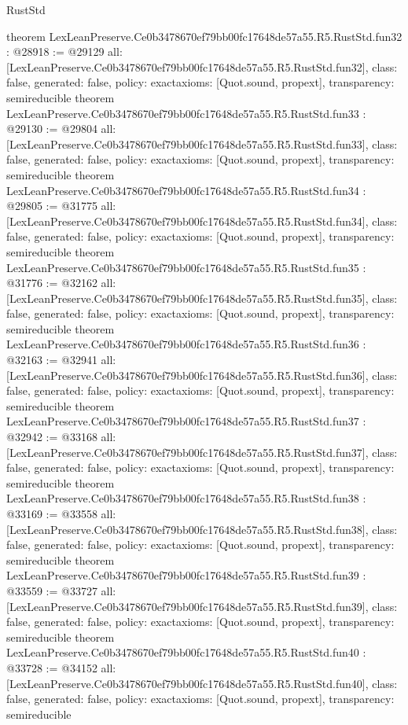 \begin{lexlean}{RustStd}
\begin{coremodule}
{}
theorem LexLeanPreserve.Ce0b3478670ef79bb00fc17648de57a55.R5.RustStd.fun32 : @28918 := @29129 {
  all: [LexLeanPreserve.Ce0b3478670ef79bb00fc17648de57a55.R5.RustStd.fun32],
  class: false,
  generated: false,
  policy: exact{axioms: [Quot.sound, propext]},
  transparency: semireducible
}
theorem LexLeanPreserve.Ce0b3478670ef79bb00fc17648de57a55.R5.RustStd.fun33 : @29130 := @29804 {
  all: [LexLeanPreserve.Ce0b3478670ef79bb00fc17648de57a55.R5.RustStd.fun33],
  class: false,
  generated: false,
  policy: exact{axioms: [Quot.sound, propext]},
  transparency: semireducible
}
theorem LexLeanPreserve.Ce0b3478670ef79bb00fc17648de57a55.R5.RustStd.fun34 : @29805 := @31775 {
  all: [LexLeanPreserve.Ce0b3478670ef79bb00fc17648de57a55.R5.RustStd.fun34],
  class: false,
  generated: false,
  policy: exact{axioms: [Quot.sound, propext]},
  transparency: semireducible
}
theorem LexLeanPreserve.Ce0b3478670ef79bb00fc17648de57a55.R5.RustStd.fun35 : @31776 := @32162 {
  all: [LexLeanPreserve.Ce0b3478670ef79bb00fc17648de57a55.R5.RustStd.fun35],
  class: false,
  generated: false,
  policy: exact{axioms: [Quot.sound, propext]},
  transparency: semireducible
}
theorem LexLeanPreserve.Ce0b3478670ef79bb00fc17648de57a55.R5.RustStd.fun36 : @32163 := @32941 {
  all: [LexLeanPreserve.Ce0b3478670ef79bb00fc17648de57a55.R5.RustStd.fun36],
  class: false,
  generated: false,
  policy: exact{axioms: [Quot.sound, propext]},
  transparency: semireducible
}
theorem LexLeanPreserve.Ce0b3478670ef79bb00fc17648de57a55.R5.RustStd.fun37 : @32942 := @33168 {
  all: [LexLeanPreserve.Ce0b3478670ef79bb00fc17648de57a55.R5.RustStd.fun37],
  class: false,
  generated: false,
  policy: exact{axioms: [Quot.sound, propext]},
  transparency: semireducible
}
theorem LexLeanPreserve.Ce0b3478670ef79bb00fc17648de57a55.R5.RustStd.fun38 : @33169 := @33558 {
  all: [LexLeanPreserve.Ce0b3478670ef79bb00fc17648de57a55.R5.RustStd.fun38],
  class: false,
  generated: false,
  policy: exact{axioms: [Quot.sound, propext]},
  transparency: semireducible
}
theorem LexLeanPreserve.Ce0b3478670ef79bb00fc17648de57a55.R5.RustStd.fun39 : @33559 := @33727 {
  all: [LexLeanPreserve.Ce0b3478670ef79bb00fc17648de57a55.R5.RustStd.fun39],
  class: false,
  generated: false,
  policy: exact{axioms: [Quot.sound, propext]},
  transparency: semireducible
}
theorem LexLeanPreserve.Ce0b3478670ef79bb00fc17648de57a55.R5.RustStd.fun40 : @33728 := @34152 {
  all: [LexLeanPreserve.Ce0b3478670ef79bb00fc17648de57a55.R5.RustStd.fun40],
  class: false,
  generated: false,
  policy: exact{axioms: [Quot.sound, propext]},
  transparency: semireducible
}
\end{coremodule}
\end{lexlean}
